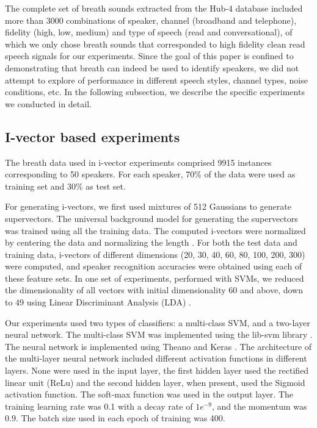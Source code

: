 \documentclass[a4paper]{article}
\begin{document}
The complete set of breath sounds extracted from the Hub-4 database included more than 3000 combinations of speaker, channel (broadband and telephone), fidelity (high, low, medium) and type of speech (read and conversational), of which we only chose breath sounds that corresponded to high fidelity clean read speech signals for our experiments. Since the goal of this paper is confined to demonstrating that breath can indeed be used to identify speakers, we did not attempt to explore of performance in different speech styles, channel types, noise conditions, etc. In the following subsection, we describe the specific experiments we conducted in detail.

\subsection{I-vector based experiments}
The breath data used in i-vector experiments comprised 9915 instances corresponding to 50 speakers. For each speaker, 70\% of the data were used as training set and 30\% as test set. 

For generating i-vectors, we first used mixtures of 512 Gaussians to generate supervectors. The universal background model for generating the supervectors was trained using all the training data. The computed i-vectors were normalized by centering the data and normalizing the length  \cite{i-vectorN}. For both the test data and training data, i-vectors of different dimensions (20, 30, 40, 60, 80, 100, 200, 300) were computed, and speaker recognition accuracies were obtained using each of these feature sets. In one set of experiments, performed with SVMs, we reduced the dimensionality of all vectors with initial dimensionality 60 and above, down to 49 using Linear Discriminant Analysis (LDA)  \cite{izenman2013linear}.

Our experiments used two types of classifiers: a multi-class SVM, and a two-layer neural network. The multi-class SVM was implemented using the lib-svm library  \cite{LIBSVM}. The neural network is implemented using Theano  \cite{2016arXiv160502688short} and Keras  \cite{chollet2015keras}. The architecture of the 
multi-layer neural network included different activation functions in different layers. None were used in the input layer, the first hidden layer used the rectified linear unit (ReLu) and the second hidden layer, when present, used the Sigmoid activation function. The soft-max function was used in the output layer. The training learning rate was 0.1 with a decay rate of $1e^{-9}$, and the momentum was 0.9. The batch size used in each epoch of training was 400. 
\end{document}
